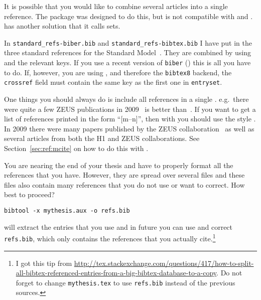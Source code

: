 It is possible that you would like to combine several articles into a
single reference. The  package was designed to do this,
but is not compatible with  and
.  has another solution that it
calls sets.

In \texttt{standard\_refs-biber.bib} and
\texttt{standard\_refs-bibtex.bib} I have put in the three standard
references for the Standard Model~\cite{gsw}. They are combined by
using  and the relevant
keys. If you use a recent version of \texttt{biber} ()
this is all you have to do.  If, however, you are using , and therefore the \texttt{bibtex8} backend, the
\texttt{crossref} field must contain the same key as the first one in
\texttt{entryset}.

One things you should always do is include all references in a single
. e.g.\ there were quite a few ZEUS publications in
2009~\cite{Chekanov:2009qja,Chekanov:2009zz,Chekanov:2009tu} is better
than~\cite{Chekanov:2009qja}\cite{Chekanov:2009zz}\cite{Chekanov:2009tu}.
If you want to get a list of references printed in the form \enquote{[m--n]},
then with  you should use the style
. In 2009 there were many papers published by the
ZEUS
collaboration~\cite{Chekanov:2009qja,Chekanov:2009zz,Chekanov:2009tu}
as well as several articles from both the H1 and ZEUS
collaborations\cite{Chekanov:2009wt,Aaron:2009wg}. See
Section~\ref{sec:ref:mcite} on how to do this with \BibTeX.

You are nearing the end of your thesis and have to properly format all
the references that you have. However, they are spread over several
files and these files also contain many references that you do not use
or want to correct. How best to proceed?
\begin{verbatim}
bibtool -x mythesis.aux -o refs.bib
\end{verbatim}
will extract the entries that you use and in future you can use and
correct \texttt{refs.bib}, which only contains the references that you
actually cite.\footnote{%
I got this tip from
\url{http://tex.stackexchange.com/questions/417/how-to-split-all-bibtex-referenced-entries-from-a-big-bibtex-database-to-a-copy}. Do
not forget to change \texttt{mythesis.tex} to use
\texttt{refs.bib} instead of the previous sources.}


